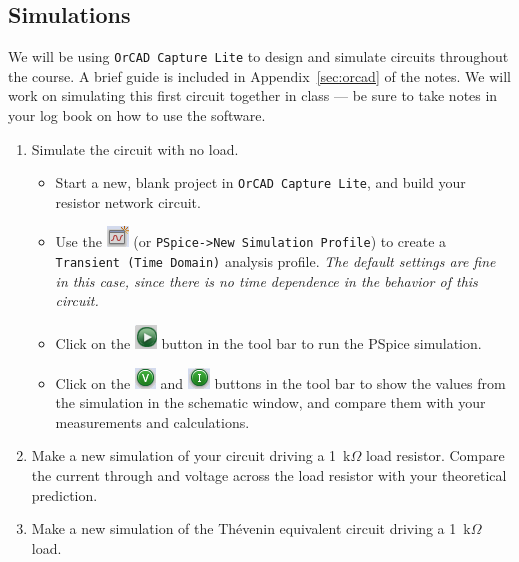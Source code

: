 \documentclass[11pt]{article}
\begin{document}
\subsection*{Simulations}

We will be using \texttt{OrCAD Capture Lite} to design and simulate
circuits throughout the course. A brief guide is included in
Appendix~\ref{sec:orcad} of the notes. We will work on simulating this
first circuit together in class --- be sure to take notes in your log
book on how to use the software. 
\begin{enumerate}
  \item Simulate the circuit with no load.
    \begin{itemize}
    \item Start a new, blank project in \texttt{OrCAD Capture Lite}, and
      build your resistor network circuit.

    \item Use the \includegraphics{OrCAD_NewSimProf.png} (or
      \texttt{PSpice->New Simulation Profile}) to create a
      \texttt{Transient (Time Domain)} analysis profile. 
      \emph{The default settings are fine in this case, since there is
        no time dependence in the behavior of this circuit.}

    \item Click on the \includegraphics{OrCAD_RunSim.png} button in the
      tool bar to run the PSpice simulation. 
      
    \item Click on the \includegraphics{OrCAD_ShowV.png} and
      \includegraphics{OrCAD_ShowI.png} buttons in the tool bar
      to show the values from the simulation in the schematic window, and
      compare them with your measurements and calculations.
    \end{itemize}

  \item Make a new simulation of your circuit driving a 1~k$\Omega$
    load resistor. Compare the current through and voltage across the
    load resistor with your theoretical prediction.

  \item Make a new simulation of the Th\'{e}venin equivalent circuit
    driving a 1~k$\Omega$ load.
\end{enumerate}
\end{document}
